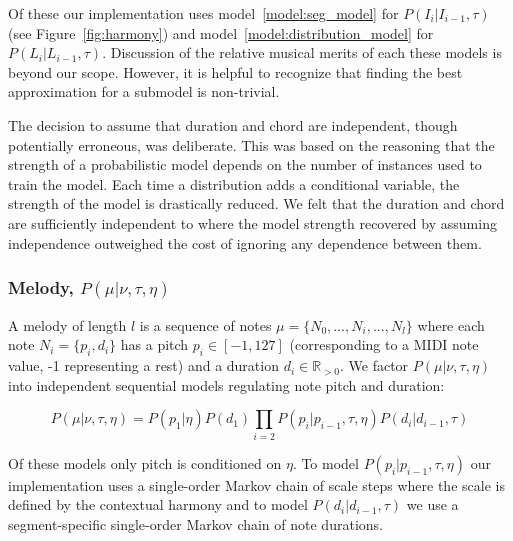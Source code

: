 \documentclass[letterpaper]{article}
\begin{document}
Of these our implementation uses model~\ref{model:seg_model} for $P(I_i|I_{i-1},\tau)$ (see Figure~\ref{fig:harmony}) and model~\ref{model:distribution_model} for $P(L_i | L_{i-1},\tau)$. Discussion of the relative musical merits of each these models is beyond our scope. However, it is helpful to recognize that finding the best approximation for a submodel is non-trivial.

The decision to assume that duration and chord are independent, though potentially erroneous, was deliberate. This was based on the reasoning that the strength of a probabilistic model depends on the number of instances used to train the model. Each time a distribution adds a conditional variable, the strength of the model is drastically reduced. We felt that the duration and chord are sufficiently independent to where the model strength recovered by assuming independence outweighed the cost of ignoring any dependence between them.

\subsubsection{Melody, $P(\mu|\nu,\tau,\eta)$}

A melody of length $l$ is a sequence of notes $\mu=\{N_0,\dots,N_i,\dots,N_l\}$ where each note $N_i = \{p_i,d_i\}$ has a pitch $p_i\in[-1,127]$  (corresponding to a MIDI note value, -1 representing a rest) and a duration $d_i \in \mathbb{R}_{>0}$. We factor $P(\mu|\nu,\tau,\eta)$ into independent sequential models regulating note pitch and duration:

\[ P(\mu|\nu,\tau,\eta) = P(p_1|\eta) P(d_1) \prod_{i=2} P(p_i|p_{i-1},\tau,\eta) P(d_i|d_{i-1},\tau) \]

Of these models only pitch is conditioned on $\eta$. To model $P(p_i|p_{i-1},\tau,\eta)$ our implementation uses a single-order Markov chain of scale steps where the scale is defined by the contextual harmony and to model $P(d_i|d_{i-1},\tau)$ we use a segment-specific single-order Markov chain of note durations.
\end{document}
